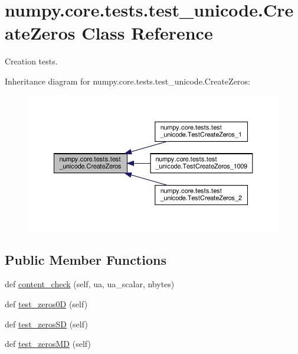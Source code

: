 \hypertarget{classnumpy_1_1core_1_1tests_1_1test__unicode_1_1CreateZeros}{}\section{numpy.\+core.\+tests.\+test\+\_\+unicode.\+Create\+Zeros Class Reference}
\label{classnumpy_1_1core_1_1tests_1_1test__unicode_1_1CreateZeros}


Creation tests.  




Inheritance diagram for numpy.\+core.\+tests.\+test\+\_\+unicode.\+Create\+Zeros\+:
\nopagebreak
\begin{figure}[H]
\begin{center}
\leavevmode
\includegraphics[width=350pt]{classnumpy_1_1core_1_1tests_1_1test__unicode_1_1CreateZeros__inherit__graph}
\end{center}
\end{figure}
\subsection*{Public Member Functions}
\begin{DoxyCompactItemize}
\item 
def \hyperlink{classnumpy_1_1core_1_1tests_1_1test__unicode_1_1CreateZeros_ad0858878eea6d6089ba15b024a80743d}{content\+\_\+check} (self, ua, ua\+\_\+scalar, nbytes)
\item 
def \hyperlink{classnumpy_1_1core_1_1tests_1_1test__unicode_1_1CreateZeros_ad8c21ef0d7e89a330f595ad1fb2787d8}{test\+\_\+zeros0D} (self)
\item 
def \hyperlink{classnumpy_1_1core_1_1tests_1_1test__unicode_1_1CreateZeros_ab1744e42677c5282e831c7920813a609}{test\+\_\+zeros\+SD} (self)
\item 
def \hyperlink{classnumpy_1_1core_1_1tests_1_1test__unicode_1_1CreateZeros_af720abc47d863709acb8c0faeeb35b96}{test\+\_\+zeros\+MD} (self)
\end{DoxyCompactItemize}


